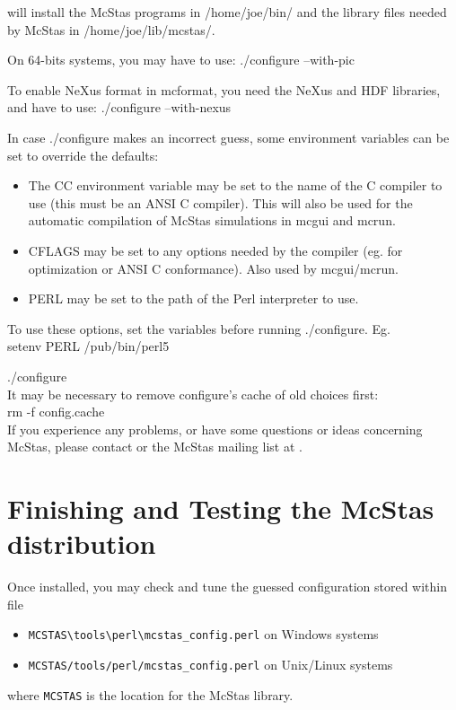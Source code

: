 \noindent will install the McStas programs in /home/joe/bin/ and the
library files needed by McStas in /home/joe/lib/mcstas/.

\noindent On 64-bits systems, you may have to use: ./configure --with-pic

\noindent To enable NeXus format in mcformat, you need the NeXus and HDF libraries, and have to use: ./configure --with-nexus

In case ./configure makes an incorrect guess, some environment variables
can be set to override the defaults:
\begin{itemize}
\item{The CC environment variable may be set to the name of the C compiler
   to use (this must be an ANSI C compiler). This will also be used for
   the automatic compilation of McStas simulations in mcgui and
   mcrun.}
\item{CFLAGS may be set to any options needed by the compiler (eg. for
   optimization or ANSI C conformance). Also used by mcgui/mcrun.}
\item{PERL may be set to the path of the Perl interpreter to use.}
\end{itemize}
\noindent To use these options, set the variables before running ./configure. Eg.\\

    setenv PERL /pub/bin/perl5

    ./configure\\

\noindent It may be necessary to remove configure's cache of old
choices first:\\


    rm -f config.cache\\


\noindent If you experience any problems, or have some questions or ideas
concerning McStas, please contact
or the McStas mailing list at .

\section{Finishing and Testing the McStas distribution}
\label{s:testing}

Once installed, you may check and tune the guessed configuration stored within file
\begin{itemize}
\item{\verb+MCSTAS\tools\perl\mcstas_config.perl+ on Windows systems}
\item{\verb+MCSTAS/tools/perl/mcstas_config.perl+ on Unix/Linux systems}
\end{itemize}
where \verb+MCSTAS+ is the location for the McStas library.

